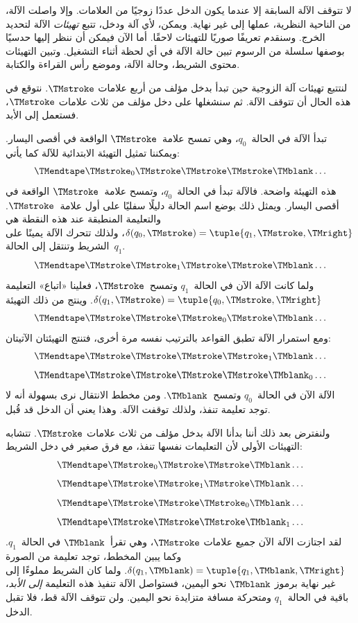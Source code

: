\documentclass[../../../include/open-logic-section]{subfiles}
\begin{document}
\begin{explain}
لا تتوقف الآلة السابقة إلا عندما يكون الدخل عددًا زوجيًا من العلامات.
وإلا واصلت الآلة، من الناحية النظرية، عملها إلى غير نهاية. ويمكن، لأي
آلة ودخل، تتبع \emph{تهيئات} الآلة لتحديد الخرج. وسنقدم تعريفًا صوريًا
للتهيئات لاحقًا. أما الآن فيمكن أن ننظر إليها حدسيًا بوصفها سلسلة من
الرسوم تبين حالة الآلة في أي لحظة أثناء التشغيل. وتبين التهيئات محتوى
الشريط، وحالة الآلة، وموضع رأس القراءة والكتابة.

لنتتبع تهيئات آلة الزوجية حين تبدأ بدخل مؤلف من أربع علامات
$\TMstroke$. نتوقع في هذه الحال أن تتوقف الآلة. ثم سنشغلها على دخل
مؤلف من ثلاث علامات $\TMstroke$، فستعمل إلى الأبد.

تبدأ الآلة في الحالة~$q_0$، وهي تمسح علامة~$\TMstroke$ الواقعة في
أقصى اليسار. ويمكننا تمثيل التهيئة الابتدائية للآلة كما يأتي:
\[
\TMendtape \TMstroke_0 \TMstroke \TMstroke \TMstroke \TMblank \ldots
\]
هذه التهيئة واضحة. فالآلة تبدأ في الحالة~$q_0$، وتمسح
علامة~$\TMstroke$ الواقعة في أقصى اليسار. ويمثل ذلك بوضع اسم الحالة
دليلًا سفليًا على أول علامة~$\TMstroke$. والتعليمة المنطبقة عند هذه
النقطة هي
$\delta(q_0,\TMstroke)=\tuple{q_1,\TMstroke,\TMright}$، ولذلك تتحرك
الآلة يمينًا على الشريط وتنتقل إلى الحالة~$q_1$.
\[
\TMendtape \TMstroke \TMstroke_1 \TMstroke \TMstroke \TMblank \ldots
\]
ولما كانت الآلة الآن في الحالة~$q_1$ وتمسح~$\TMstroke$، فعلينا
«اتباع» التعليمة $\delta(q_1,\TMstroke)=\tuple{q_0,
  \TMstroke,\TMright}$. وينتج من ذلك التهيئة
\[
\TMendtape \TMstroke \TMstroke \TMstroke_0 \TMstroke \TMblank \ldots
\]
ومع استمرار الآلة تطبق القواعد بالترتيب نفسه مرة أخرى، فتنتج
التهيئتان الآتيتان:
\[
\TMendtape \TMstroke \TMstroke \TMstroke \TMstroke_1 \TMblank \ldots
\]
\[
\TMendtape \TMstroke \TMstroke \TMstroke \TMstroke \TMblank_0 \ldots
\]
الآلة الآن في الحالة~$q_0$ وتمسح~$\TMblank$. ومن مخطط الانتقال نرى
بسهولة أنه لا توجد تعليمة تنفذ، ولذلك توقفت الآلة. وهذا يعني أن الدخل
قد قُبل.

ولنفترض بعد ذلك أننا بدأنا الآلة بدخل مؤلف من ثلاث علامات
$\TMstroke$. تتشابه التهيئات الأولى لأن التعليمات نفسها تنفذ، مع فرق
صغير في دخل الشريط:
\[
\TMendtape \TMstroke_0 \TMstroke \TMstroke \TMblank \ldots
\]
\[
\TMendtape \TMstroke \TMstroke_1 \TMstroke \TMblank \ldots
\]
\[
\TMendtape \TMstroke \TMstroke \TMstroke_0 \TMblank \ldots
\]
\[
\TMendtape \TMstroke \TMstroke \TMstroke \TMblank_1 \ldots
\]
لقد اجتازت الآلة الآن جميع علامات $\TMstroke$، وهي تقرأ~$\TMblank$
في الحالة~$q_1$. وكما يبين المخطط، توجد تعليمة من الصورة
$\delta(q_1,\TMblank)=\tuple{q_1,\TMblank,\TMright}$. ولما كان الشريط
مملوءًا إلى غير نهاية برموز $\TMblank$ نحو اليمين، فستواصل الآلة
تنفيذ هذه التعليمة \emph{إلى الأبد}، باقية في الحالة~$q_1$ ومتحركة
مسافة متزايدة نحو اليمين. ولن تتوقف الآلة قط، فلا تقبل الدخل.
\end{explain}
\end{document}
